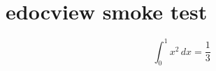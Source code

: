\documentclass{article}
\begin{document}
\section{edocview smoke test}
\[
  \int_0^1 x^2\,dx = \frac{1}{3}
\]
\end{document}

